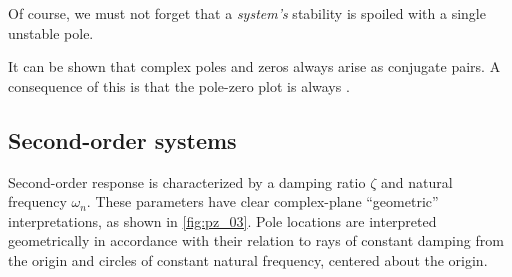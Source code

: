 \documentclass[dynamic_systems.tex]{subfiles}
\begin{document}
Of course, we must not forget that a \emph{system's} stability is spoiled with a single unstable pole.
\tags{}

It can be shown that complex poles and zeros always arise as conjugate pairs.
A consequence of this is that the pole-zero plot is always .
\tags{}

\subsection{Second-order systems}
\tags{}

Second-order response is characterized by a damping ratio $\zeta$ and natural frequency $\omega_n$.
These parameters have clear complex-plane ``geometric'' interpretations, as shown in \cref{fig:pz_03}.
Pole locations are interpreted geometrically in accordance with their relation to rays of constant damping from the origin and circles of constant natural frequency, centered about the origin.
\tags{}
\end{document}
